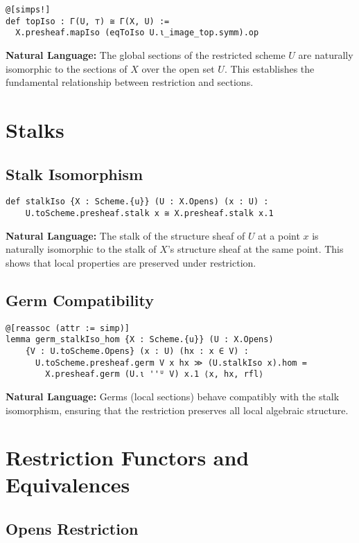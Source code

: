 \documentclass{article}
\theoremstyle{definition}
\begin{document}
\begin{lstlisting}
@[simps!]
def topIso : Γ(U, ⊤) ≅ Γ(X, U) :=
  X.presheaf.mapIso (eqToIso U.ι_image_top.symm).op
\end{lstlisting}

\textbf{Natural Language:} The global sections of the restricted scheme $U$ are naturally isomorphic to the sections of $X$ over the open set $U$. This establishes the fundamental relationship between restriction and sections.

\section{Stalks}

\subsection{Stalk Isomorphism}

\begin{lstlisting}
def stalkIso {X : Scheme.{u}} (U : X.Opens) (x : U) :
    U.toScheme.presheaf.stalk x ≅ X.presheaf.stalk x.1
\end{lstlisting}

\textbf{Natural Language:} The stalk of the structure sheaf of $U$ at a point $x$ is naturally isomorphic to the stalk of $X$'s structure sheaf at the same point. This shows that local properties are preserved under restriction.

\subsection{Germ Compatibility}

\begin{lstlisting}
@[reassoc (attr := simp)]
lemma germ_stalkIso_hom {X : Scheme.{u}} (U : X.Opens)
    {V : U.toScheme.Opens} (x : U) (hx : x ∈ V) :
      U.toScheme.presheaf.germ V x hx ≫ (U.stalkIso x).hom =
        X.presheaf.germ (U.ι ''ᵁ V) x.1 ⟨x, hx, rfl⟩
\end{lstlisting}

\textbf{Natural Language:} Germs (local sections) behave compatibly with the stalk isomorphism, ensuring that the restriction preserves all local algebraic structure.

\section{Restriction Functors and Equivalences}

\subsection{Opens Restriction}
\end{document}
